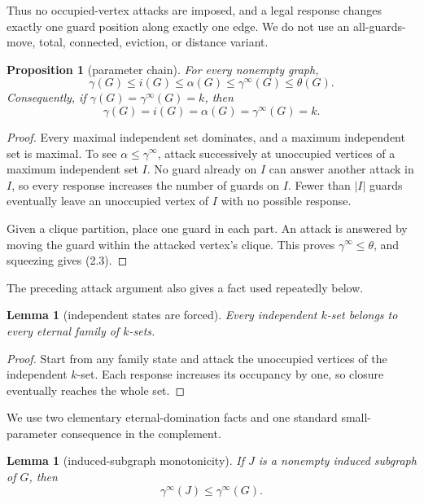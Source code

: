 \documentclass[11pt]{article}
\newtheorem{lemma}[theorem]{Lemma}
\newtheorem{proposition}[theorem]{Proposition}
\theoremstyle{definition}
\theoremstyle{remark}
\newcommand{\gaminf}{\gamma^{\infty}}
\begin{document}
Thus no occupied-vertex attacks are imposed, and a legal response changes
exactly one guard position along exactly one edge.  We do not use an
all-guards-move, total, connected, eviction, or distance variant.

\begin{proposition}[parameter chain]\label{prop:chain}
For every nonempty graph,
\[
  \gamma(G)\leq i(G)\leq\alpha(G)\leq\gaminf(G)\leq\theta(G).
\tag{2.2}
\]
Consequently, if \(\gamma(G)=\gaminf(G)=k\), then
\[
  \gamma(G)=i(G)=\alpha(G)=\gaminf(G)=k.
\tag{2.3}
\]
\end{proposition}

\begin{proof}
Every maximal independent set dominates, and a maximum independent set is
maximal.  To see \(\alpha\leq\gaminf\), attack successively at unoccupied
vertices of a maximum independent set \(I\).  No guard already on \(I\)
can answer another attack in \(I\), so every response increases the number
of guards on \(I\).  Fewer than \(|I|\) guards eventually leave an
unoccupied vertex of \(I\) with no possible response.

Given a clique partition, place one guard in each part.  An attack is
answered by moving the guard within the attacked vertex's clique.  This
proves \(\gaminf\leq\theta\), and squeezing gives (2.3).
\end{proof}

The preceding attack argument also gives a fact used repeatedly below.

\begin{lemma}[independent states are forced]\label{lem:independent-forced}
Every independent \(k\)-set belongs to every eternal family of \(k\)-sets.
\end{lemma}

\begin{proof}
Start from any family state and attack the unoccupied vertices of the
independent \(k\)-set.  Each response increases its occupancy by one, so
closure eventually reaches the whole set.
\end{proof}

We use two elementary eternal-domination facts and one standard
small-parameter consequence in the complement.

\begin{lemma}[induced-subgraph monotonicity]\label{lem:induced}
If \(J\) is a nonempty induced subgraph of \(G\), then
\[
  \gaminf(J)\leq\gaminf(G).
\tag{2.4}
\]
\end{lemma}
\end{document}
